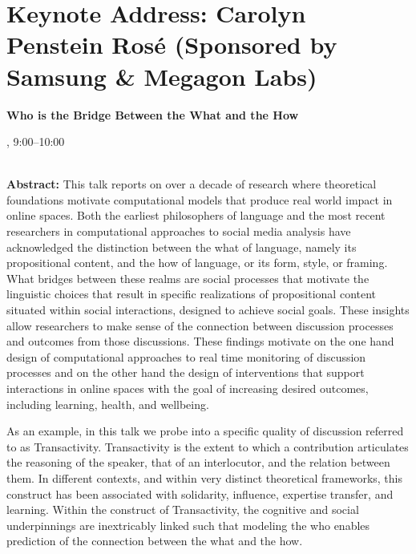 \section{Keynote Address: Carolyn Penstein Rosé (Sponsored by Samsung \& Megagon Labs)}

\begin{center}
\begin{Large}
{\bfseries\Large Who is the Bridge Between the What and the How}
\vspace{1em}\par
\end{Large}

\daydateyear, 9:00--10:00 \vspace{1em}\\
\PlenaryLoc \\
\vspace{1em}\par
\end{center}

\noindent

{\bf Abstract:} This talk reports on over a decade of research where theoretical foundations motivate computational models that produce real world impact in online spaces. Both the earliest philosophers of language and the most recent researchers in computational approaches to social media analysis have acknowledged the distinction between the what of language, namely its propositional content, and the how of language, or its form, style, or framing. What bridges between these realms are social processes that motivate the linguistic choices that result in specific realizations of propositional content situated within social interactions, designed to achieve social goals. These insights allow researchers to make sense of the connection between discussion processes and outcomes from those discussions. These findings motivate on the one hand design of computational approaches to real time monitoring of discussion processes and on the other hand the design of interventions that support interactions in online spaces with the goal of increasing desired outcomes, including learning, health, and wellbeing.

As an example, in this talk we probe into a specific quality of discussion referred to as Transactivity. Transactivity is the extent to which a contribution articulates the reasoning of the speaker, that of an interlocutor, and the relation between them. In different contexts, and within very distinct theoretical frameworks, this construct has been associated with solidarity, influence, expertise transfer, and learning. Within the construct of Transactivity, the cognitive and social underpinnings are inextricably linked such that modeling the who enables prediction of the connection between the what and the how.

